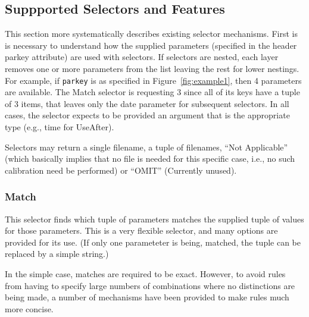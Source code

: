 \documentclass[final,authoryear,5p,times,twocolumn]{elsarticle}
\begin{document}
\subsection{Suppported Selectors and Features}

This section more systematically describes existing selector mechanisms. 
First is is necessary to understand how the supplied parameters (specified
in the header parkey attribute) are used with selectors. If selectors are 
nested, each layer removes one or more parameters from the list leaving 
the rest for lower nestings. For example, if \texttt{parkey} is as specified in
Figure~\ref{fig:example1}, then 4 parameters are available. The Match 
selector is requesting 3 since all of its keys have a tuple of 3 items,
that leaves only the date parameter for subsequent selectors.
In all cases, the selector expects to be provided an argument that is the 
appropriate type (e.g., time for UseAfter). 

Selectors may return a single filename, a tuple of filenames,
``Not Applicable'' (which basically implies that no file is
needed for this specific case, i.e., no such calibration need be 
performed) or ``OMIT'' (Currently unused).

\subsubsection{Match}
This selector finds which tuple of parameters matches the supplied tuple
of values for those parameters. This is a very flexible selector, and 
many options are provided for its use. (If only one parameteter is being,
matched, the tuple can be replaced by a simple string.)

In the simple case, matches are required to be exact. However, to avoid
rules from having to specify large numbers of combinations where no
distinctions are being made, a number of mechanisms have been provided
to make rules much more concise.
\end{document}
